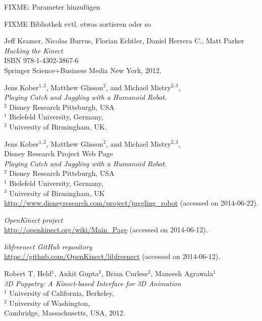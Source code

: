 \documentclass[12pt,a4paper,ngerman]{scrartcl}
\begin{document}
{\color{red} FIXME: Parameter hinzufügen}


\newpage
{}
{}
\renewcommand{\refname}{Quellen}

\begin{thebibliography}{99}

{\color{red}
FIXME Bibliothek evtl. etwas sortieren oder so}

Jeff Kramer, Nicolas Burrus, Florian Echtler, Daniel Herrera C., Matt Parker\\
{\em Hacking the Kinect}\\
ISBN 978-1-4302-3867-6\\
Springer Science+Business Media New York, 2012.

Jens Kober$^{1,2}$, Matthew Glisson$^{2}$, and Michael Mistry$^{2,3}$,\\
{\em Playing Catch and Juggling with a Humanoid Robot}.\\
$^{2}$ Disney Research Pittsburgh, USA\\
$^{1}$ Bielefeld University, Germany,\\
$^{3}$ University of Birmingham, UK.

Jens Kober$^{1,2}$, Matthew Glisson$^{2}$, and Michael Mistry$^{2,3}$,\\
Disney Research Project Web Page\\
{\em Playing Catch and Juggling with a Humanoid Robot}.\\
$^{2}$ Disney Research Pittsburgh, USA\\
$^{1}$ Bielefeld University, Germany,\\
$^{3}$ University of Birmingham, UK\\
\url{http://www.disneyresearch.com/project/juggling_robot} (accessed on 2014-06-22).

{\em OpenKinect project}\\
\url{http://openkinect.org/wiki/Main_Page} (accessed on 2014-06-12).

{\em libfreenect GitHub repository}\\
\url{https://github.com/OpenKinect/libfreenect} (accessed on 2014-06-12).

Robert T. Held$^{1}$, Ankit Gupta$^{2}$, Brian Curless$^{2}$, Maneesh Agrawala$^{1}$\\
{\em 3D Puppetry: A Kinect-based Interface for 3D Animation}\\
$^{1}$ University of California, Berkeley,\\
$^{2}$ University of Washington,\\
Cambridge, Massachusetts, USA, 2012.


\end{thebibliography}
\end{document}
